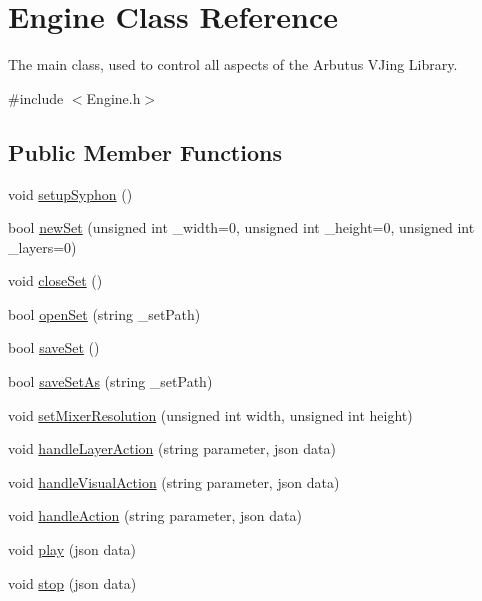 \hypertarget{class_engine}{}\section{Engine Class Reference}
\label{class_engine}


The main class, used to control all aspects of the Arbutus V\+Jing Library.  




{\ttfamily \#include $<$Engine.\+h$>$}

\subsection*{Public Member Functions}
\begin{DoxyCompactItemize}
\item 
void \hyperlink{class_engine_a7b198cae741a0031f89dab6844e44ed2}{setup\+Syphon} ()
\item 
bool \hyperlink{class_engine_adc03481dd61714c7bfc3ffe48e2772a9}{new\+Set} (unsigned int \+\_\+width=0, unsigned int \+\_\+height=0, unsigned int \+\_\+layers=0)
\item 
void \hyperlink{class_engine_a360e63d1c939cc8a70f0cd2fd289fc87}{close\+Set} ()
\item 
bool \hyperlink{class_engine_ae1aab6389f4cc21cf760689f95c6d298}{open\+Set} (string \+\_\+set\+Path)
\item 
bool \hyperlink{class_engine_abdf0e7642de80e72a9a64c559d2af9ba}{save\+Set} ()
\item 
bool \hyperlink{class_engine_a699dad06243f1f462f9e2f6f6e33cbdb}{save\+Set\+As} (string \+\_\+set\+Path)
\item 
void \hyperlink{class_engine_a368d1d6924b49241c994b2857606421b}{set\+Mixer\+Resolution} (unsigned int width, unsigned int height)
\item 
void \hyperlink{class_engine_a5633281e514055b66fde30596305d646}{handle\+Layer\+Action} (string parameter, json data)
\item 
void \hyperlink{class_engine_a8342ba4b8e00754a5dc78e9590df4fbb}{handle\+Visual\+Action} (string parameter, json data)
\item 
void \hyperlink{class_engine_ae25acfdee442242b7c1262f02f8b7274}{handle\+Action} (string parameter, json data)
\item 
void \hyperlink{class_engine_a7ad20895ed6034844683fd2190bbd911}{play} (json data)
\item 
void \hyperlink{class_engine_a1c64956ca2429493e66c8aa0e5f3d23f}{stop} (json data)

\end{DoxyCompactItemize}
